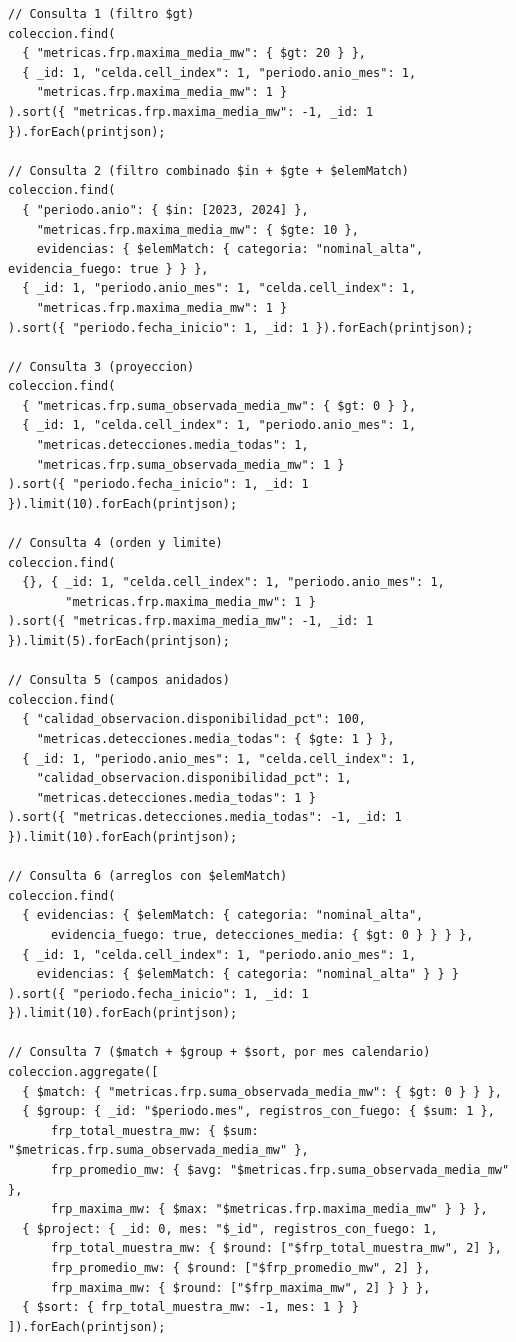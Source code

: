 \documentclass[11pt]{article}
\begin{document}
\begin{lstlisting}
// Consulta 1 (filtro $gt)
coleccion.find(
  { "metricas.frp.maxima_media_mw": { $gt: 20 } },
  { _id: 1, "celda.cell_index": 1, "periodo.anio_mes": 1,
    "metricas.frp.maxima_media_mw": 1 }
).sort({ "metricas.frp.maxima_media_mw": -1, _id: 1 }).forEach(printjson);

// Consulta 2 (filtro combinado $in + $gte + $elemMatch)
coleccion.find(
  { "periodo.anio": { $in: [2023, 2024] },
    "metricas.frp.maxima_media_mw": { $gte: 10 },
    evidencias: { $elemMatch: { categoria: "nominal_alta", evidencia_fuego: true } } },
  { _id: 1, "periodo.anio_mes": 1, "celda.cell_index": 1,
    "metricas.frp.maxima_media_mw": 1 }
).sort({ "periodo.fecha_inicio": 1, _id: 1 }).forEach(printjson);

// Consulta 3 (proyeccion)
coleccion.find(
  { "metricas.frp.suma_observada_media_mw": { $gt: 0 } },
  { _id: 1, "celda.cell_index": 1, "periodo.anio_mes": 1,
    "metricas.detecciones.media_todas": 1,
    "metricas.frp.suma_observada_media_mw": 1 }
).sort({ "periodo.fecha_inicio": 1, _id: 1 }).limit(10).forEach(printjson);

// Consulta 4 (orden y limite)
coleccion.find(
  {}, { _id: 1, "celda.cell_index": 1, "periodo.anio_mes": 1,
        "metricas.frp.maxima_media_mw": 1 }
).sort({ "metricas.frp.maxima_media_mw": -1, _id: 1 }).limit(5).forEach(printjson);

// Consulta 5 (campos anidados)
coleccion.find(
  { "calidad_observacion.disponibilidad_pct": 100,
    "metricas.detecciones.media_todas": { $gte: 1 } },
  { _id: 1, "periodo.anio_mes": 1, "celda.cell_index": 1,
    "calidad_observacion.disponibilidad_pct": 1,
    "metricas.detecciones.media_todas": 1 }
).sort({ "metricas.detecciones.media_todas": -1, _id: 1 }).limit(10).forEach(printjson);

// Consulta 6 (arreglos con $elemMatch)
coleccion.find(
  { evidencias: { $elemMatch: { categoria: "nominal_alta",
      evidencia_fuego: true, detecciones_media: { $gt: 0 } } } },
  { _id: 1, "celda.cell_index": 1, "periodo.anio_mes": 1,
    evidencias: { $elemMatch: { categoria: "nominal_alta" } } }
).sort({ "periodo.fecha_inicio": 1, _id: 1 }).limit(10).forEach(printjson);

// Consulta 7 ($match + $group + $sort, por mes calendario)
coleccion.aggregate([
  { $match: { "metricas.frp.suma_observada_media_mw": { $gt: 0 } } },
  { $group: { _id: "$periodo.mes", registros_con_fuego: { $sum: 1 },
      frp_total_muestra_mw: { $sum: "$metricas.frp.suma_observada_media_mw" },
      frp_promedio_mw: { $avg: "$metricas.frp.suma_observada_media_mw" },
      frp_maxima_mw: { $max: "$metricas.frp.maxima_media_mw" } } },
  { $project: { _id: 0, mes: "$_id", registros_con_fuego: 1,
      frp_total_muestra_mw: { $round: ["$frp_total_muestra_mw", 2] },
      frp_promedio_mw: { $round: ["$frp_promedio_mw", 2] },
      frp_maxima_mw: { $round: ["$frp_maxima_mw", 2] } } },
  { $sort: { frp_total_muestra_mw: -1, mes: 1 } }
]).forEach(printjson);


\end{lstlisting}
\end{document}
